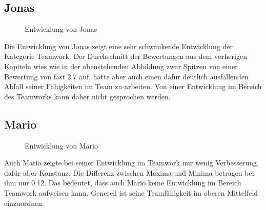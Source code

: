 \subsection{Jonas}

\begin{figure}[H]
	\centering
	\label{img:jonasDevelopment}
	\caption{Entwicklung von Jonas}
\end{figure}


Die Entwicklung von Jonas zeigt eine sehr schwankende Entwicklung der Kategorie Teamwork. Der Durchschnitt der Bewertungen aus dem vorherigen Kapiteln wies wie in der obenstehenden Abbildung zwar Spitzen von einer Bewertung von fast 2.7 auf, hatte aber auch einen dafür deutlich ausfallenden Abfall seiner Fähigkeiten im Team zu arbeiten. Von einer Entwicklung im Bereich des Teamworks kann daher nicht gesprochen werden.

\subsection{Mario}
\begin{figure}[H]
	\centering
	\label{img:marioDevelopment}
	\caption{Entwicklung von Mario}
\end{figure}



Auch Mario zeigte bei seiner Entwicklung im Teamwork nur wenig Verbesserung, dafür aber Konstanz. Die Differenz zwischen Maxima und Minima betragen bei ihm nur 0.12. Das bedeutet, dass auch Mario keine Entwicklung im Bereich Teamwork aufweisen kann. Generell ist seine Teamfähigkeit im oberen Mittelfeld einzuordnen.


